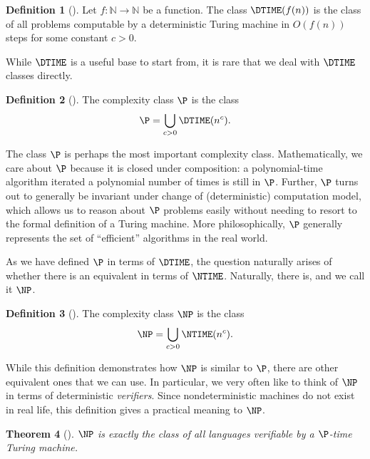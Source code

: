 \documentclass{reedthesis}
\theoremstyle{plain}
\newtheorem{thm}{Theorem}[section]
\theoremstyle{definition}
\newtheorem{defn}[thm]{Definition}
\theoremstyle{remark}
\numberwithin{equation}{section}
\begin{document}
\begin{defn}[{\cite[Def.\ 1.19]{AB09}}]\label{def:dtime}
  Let $f: \mathbb{N} \rightarrow \mathbb{N}$ be a function. The class $\DTIME(f(n))$ is the class of all
  problems computable by a deterministic Turing machine in $O(f(n))$ steps for
  some constant $c > 0$.
\end{defn}

While $\DTIME$ is a useful base to start from, it is rare that we deal with
$\DTIME$ classes directly. %

\begin{defn}[{\cite[Def.\ 1.20]{AB09}}]\label{def:p}
  The complexity class $\P$ is the class
  \[
    \P = \bigcup_{c > 0}\DTIME(n^{c}).
  \]
\end{defn}

The class $\P$ is perhaps the most important complexity class. Mathematically,
we care about $\P$ because it is closed under composition: a polynomial-time
algorithm iterated a polynomial number of times is still in $\P$. Further, $\P$
turns out to generally be invariant under change of (deterministic) computation
model, which allows us to reason about $\P$ problems easily without needing to
resort to the formal definition of a Turing machine. More philosophically, $\P$
generally represents the set of ``efficient'' algorithms in the real world.

As we have defined $\P$ in terms of $\DTIME$, the question naturally arises of
whether there is an equivalent in terms of $\NTIME$. Naturally, there is, and we
call it $\NP$.

\begin{defn}[{\cite[Cor.\ 7.22]{Sip97}}]\label{def:np}
  The complexity class $\NP$ is the class
  \[
    \NP = \bigcup_{c > 0}\NTIME(n^{c}).
  \]
\end{defn}

While this definition demonstrates how $\NP$ is similar to $\P$, there are other
equivalent ones that we can use. In particular, we very often like to think of
$\NP$ in terms of deterministic \emph{verifiers}. Since nondeterministic
machines do not exist in real life, this definition gives a practical meaning to
$\NP$.

\begin{thm}[{\cite[Def.\ 7.19]{Sip97}}]\label{thm:np-verifier}
  $\NP$ is exactly the class of all languages verifiable by a $\P$-time Turing
  machine.
\end{thm}
\end{document}
